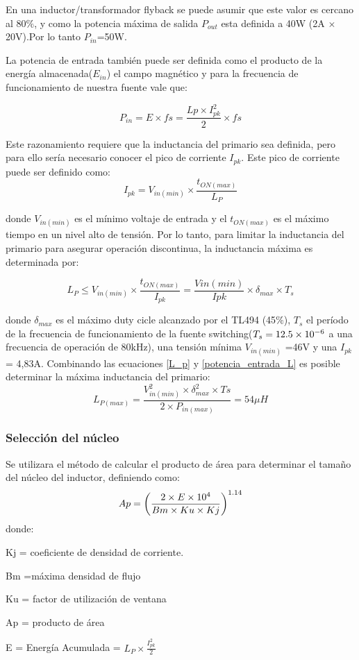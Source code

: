 En una inductor/transformador flyback se puede asumir que este valor es cercano al $80\%$, y como la potencia máxima de salida $P_{out}$ esta definida a 40W (2A $\times$ 20V).Por lo tanto $P_{in}$=50W.

La potencia de entrada también puede ser definida como el producto de la energía almacenada($E_{in}$) el campo magnético y para la frecuencia de funcionamiento de nuestra fuente vale que:

\begin{equation}
P_{in}= E \times fs = \frac{Lp \times I_{pk}^2}{2} \times fs \label{potencia_entrada_L}
\end{equation}

Este razonamiento requiere que la inductancia del primario sea definida, pero para ello sería necesario conocer el pico de corriente $I_{pk}$. Este pico de corriente puede ser definido como:
$$
I_{pk}=V_{in(min)} \times \frac{t_{ON(max)}}{L_P}
$$

donde $V_{in(min)}$ es el mínimo voltaje de entrada y el $t_{ON(max)}$ es el máximo tiempo en un nivel alto de tensión. Por lo tanto, para limitar la inductancia del primario para asegurar operación discontinua, la inductancia máxima es determinada por:

\begin{equation}
L_P \leq V_{in(min)} \times \frac{t_{ON(max)}}{I_{pk}}= \frac{V{in(min)}}{Ipk} \times \delta_{max} \times T_s \label{L_p}   
\end{equation}

donde  $\delta_{max}$ es el máximo duty cicle alcanzado por el TL494 (45$\%$), $T_s$ el período de la frecuencia de funcionamiento de la fuente switching($T_s =12.5\times 10^{-6}$ a una frecuencia de operación de 80kHz), una tensión mínima $V_{in(min)}$ =46V y una $I_{pk}$= 4,83A.
Combinando las ecuaciones \ref{L_p} y \ref{potencia_entrada_L} es posible determinar la máxima inductancia del primario:
$$
L_{P(max)} = \frac{V_{in(min)}^2 \times \delta_{max}^2 \times Ts}{2 \times P_{in(max)}} = 54\mu H
$$


\subsubsection{Selección del núcleo}


Se utilizara el método de calcular el producto de área para determinar el tamaño del núcleo del inductor, definiendo como:
$$
Ap= {\left( \frac{  2 \times E \times 10^{4}}{Bm \times Ku \times Kj} \right) } ^{ 1.14}
$$
donde:
\begin{list}{ }
 \item Kj = coeficiente de densidad de corriente.
\item Bm =máxima densidad  de flujo 
\item Ku = factor de utilización de ventana 
\item Ap = producto de área 
\item E = Energía Acumulada = $ L_P \times \frac{I_{pk}^2 }{2}$ 
\item
\end{list}

